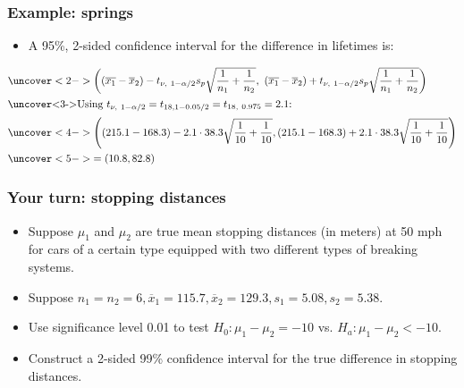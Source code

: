 \documentclass[handout]{beamer}\usepackage{graphicx, color}
\providecommand{\ov}[1]{\overline{#1}}
\numberwithin{equation}{section}
\begin{document}
\begin{frame}
\frametitle{Example: springs} \scriptsize
\begin{itemize}
\item A 95\%, 2-sided confidence interval for the difference in lifetimes is:
\end{itemize}
\begin{align*}
&\uncover<2->{\left ((\ov{x_1} - \ov{x}_2) - t_{\nu, \ 1 - \alpha/2} s_p \sqrt{\frac{1}{n_1} + \frac{1}{n_2}} , \ (\ov{x_1} - \ov{x}_2) + t_{\nu, \ 1 - \alpha/2} s_p \sqrt{\frac{1}{n_1} + \frac{1}{n_2}} \right )} \\
\intertext{\uncover<3->{Using $t_{\nu, \ 1 - \alpha/2} = t_{18, 1 - 0.05/2} = t_{18, \ 0.975} = 2.1$:}}
&\uncover<4->{\left ((215.1 - 168.3) - 2.1 \cdot 38.3 \sqrt{\frac{1}{10} + \frac{1}{10}} , (215.1 - 168.3) + 2.1 \cdot 38.3 \sqrt{\frac{1}{10} + \frac{1}{10}} \right )} \\
&\uncover<5->{=  (10.8, 82.8)}
\end{align*}
\begin{itemize}
\end{itemize}
\end{frame}
















\begin{frame}
\frametitle{Your turn: stopping distances}
\begin{itemize}
\item Suppose $\mu_1$ and $\mu_2$ are true mean stopping distances (in meters) at 50 mph for cars of a certain type equipped with two different types of breaking systems. 
\pause \item Suppose $n_1 = n_2 = 6, \ov{x}_1 = 115.7, \ov{x}_2 = 129.3, s_1 = 5.08, s_2 = 5.38$.
\pause \item Use significance level 0.01 to test $H_0: \mu_1 - \mu_2 = -10$ vs. $H_a: \mu_1 - \mu_2 < -10$. 
\pause \item Construct a 2-sided 99\% confidence interval for the true difference in stopping distances.
\end{itemize}
\end{frame}
\end{document}
